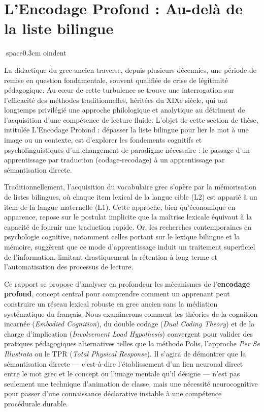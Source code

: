

\section{L'Encodage Profond : Au-delà de la liste bilingue}
space{0.3cm}
oindent

La didactique du grec ancien traverse, depuis plusieurs décennies, une période de remise en question
fondamentale, souvent qualifiée de crise de légitimité pédagogique. Au cœur de cette turbulence se
trouve une interrogation sur l'efficacité des méthodes traditionnelles, héritées du XIXe siècle, qui
ont longtemps privilégié une approche philologique et analytique au détriment de l'acquisition d'une
compétence de lecture fluide. L'objet de cette section de thèse, intitulée \og L'Encodage Profond :
dépasser la liste bilingue pour lier le mot à une image ou un contexte\fg{}, est d'explorer les
fondements cognitifs et psycholinguistiques d'un changement de paradigme nécessaire : le passage
d'un apprentissage par traduction (codage-recodage) à un apprentissage par sémantisation directe.

Traditionnellement, l'acquisition du vocabulaire grec s'opère par la mémorisation de listes
bilingues, où chaque item lexical de la langue cible (L2) est apparié à un item de la langue
maternelle (L1). Cette approche, bien qu'économique en apparence, repose sur le postulat implicite
que la maîtrise lexicale équivaut à la capacité de fournir une traduction rapide. Or, les recherches
contemporaines en psychologie cognitive, notamment celles portant sur le lexique bilingue et la
mémoire, suggèrent que ce mode d'apprentissage induit un traitement superficiel de l'information,
limitant drastiquement la rétention à long terme et l'automatisation des processus de lecture.

Ce rapport se propose d'analyser en profondeur les mécanismes de l'\textbf{encodage profond},
concept central pour comprendre comment un apprenant peut construire un réseau lexical robuste en
grec ancien sans la médiation systématique du français. Nous examinerons comment les théories de la
cognition incarnée (\textit{Embodied Cognition}), du double codage (\textit{Dual Coding Theory}) et
de la charge d'implication (\textit{Involvement Load Hypothesis}) convergent pour valider des
pratiques pédagogiques alternatives telles que la méthode Polis, l'approche \textit{Per Se
Illustrata} ou le TPR (\textit{Total Physical Response}). Il s'agira de démontrer que la
sémantisation directe — c'est-à-dire l'établissement d'un lien neuronal direct entre le mot grec et
le concept ou l'image mentale qu'il désigne — n'est pas seulement une technique d'animation de
classe, mais une nécessité neurocognitive pour passer d'une connaissance déclarative instable à une
compétence procédurale durable.


